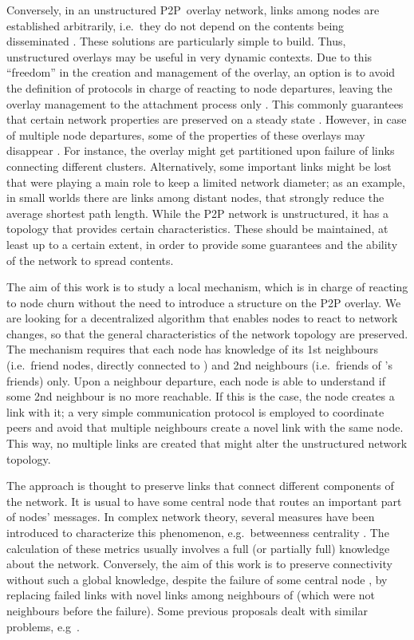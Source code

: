 \documentclass{www13-companion-accepted}
\begin{document}
Conversely, in an unstructured \ac{P2P}~overlay network, links among nodes are established arbitrarily, i.e.~they do not depend on the contents being disseminated \cite{EberspacherS05a,simplex,Leitao}.
These solutions are particularly simple to build. Thus, unstructured overlays may be useful in very dynamic contexts. 
Due to this ``freedom'' in the creation and management of the overlay, an option is to avoid the definition of protocols in charge of reacting to node departures, leaving the overlay management to the attachment process only \cite{shimada}. This commonly guarantees that certain network properties are preserved on a steady state \cite{gridpeer}.
However, in case of multiple node departures, some of the properties of these overlays may disappear \cite{Leonard:2005}. For instance, the overlay might get partitioned upon failure of links connecting different clusters. 
Alternatively, some important links might be lost that were playing a main role to keep a limited network diameter; as an example, in small worlds there are links among distant nodes, that strongly reduce the average shortest path length.
While the P2P network is unstructured, it has a topology that provides certain characteristics. These should be maintained, at least up to a certain extent, in order to provide some guarantees and the ability of the network to spread contents.

The aim of this work is to study a local mechanism, which is in charge of reacting to node churn without the need to introduce a structure on the P2P overlay. 
We are looking for a decentralized algorithm that enables nodes to react to network changes, so that the general characteristics of the network topology are preserved.
The mechanism requires that each node  has knowledge of its 1st neighbours (i.e.~friend nodes, directly connected to ) and 2nd neighbours (i.e.~friends of 's friends) only. Upon a neighbour departure, each node is able to understand if some 2nd neighbour is no more reachable. 
If this is the case, the node creates a link with it; a very simple communication protocol is employed to coordinate peers and avoid that multiple neighbours create a novel link with the same node. This way, no multiple links are created that might alter the unstructured network topology.

The approach is thought to preserve links that connect different components of the network. It is usual to have some central node that routes an important part of nodes' messages. In complex network theory, several measures have been introduced to characterize this phenomenon, e.g.~betweenness centrality \cite{Bader:2007,Newman200539}.
The calculation of these metrics usually involves a full (or partially full) knowledge about the network. Conversely, the aim of this work is to preserve connectivity without such a global knowledge, despite the failure of some central node , by replacing failed links with novel links among neighbours of  (which were not neighbours before the  failure). Some previous proposals dealt with similar problems, e.g~\cite{massoulie,VoulgarisGS05}.
\end{document}
